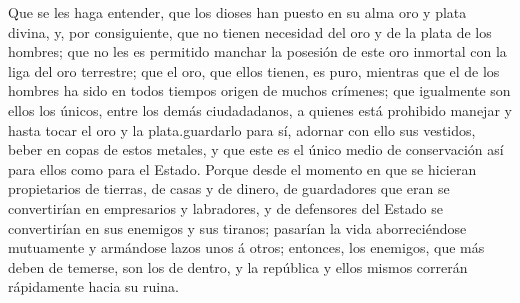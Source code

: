 \documentclass[10pt]{book}
\begin{document}
Que se les haga entender, que los dioses han puesto en su alma oro y plata divina, y, por consiguiente, que no tienen necesidad del oro y de la plata de los hombres; que no les es permitido manchar
la posesión de este oro inmortal con la liga del oro terrestre; que el oro, que ellos tienen, es puro, mientras que el de los hombres ha sido en todos tiempos origen de muchos crímenes; que igualmente son ellos los únicos, entre los demás ciudadadanos, a quienes está prohibido manejar y hasta tocar el oro y la plata.guardarlo para sí, adornar con ello sus vestidos, beber en copas de estos metales, y que este es el único medio de conservación así para ellos como para el Estado. Porque desde el momento en que se hicieran propietarios de tierras, de casas y de dinero, de guardadores que eran se convertirían en empresarios y labradores, y de defensores del Estado se convertirían en sus enemigos y sus tiranos; pasarían la vida aborreciéndose mutuamente y armándose lazos unos á otros; entonces, los enemigos, que más deben de temerse, son los de dentro, y la república y ellos mismos correrán rápidamente hacia su ruina.
\end{document}
